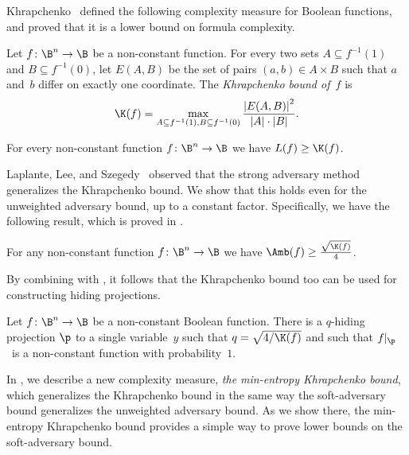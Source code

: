 Khrapchenko~\cite{K72} defined the following complexity measure
for Boolean functions, and proved that it is a lower bound on formula
complexity. 
\begin{definition}
\label{def:khrapchenko}Let $f\colon\B^{n}\to\B$ be a non-constant function.
For every two sets $A\subseteq f^{-1}(1)$ and $B\subseteq f^{-1}(0)$,
let $E(A,B)$ be the set of pairs $(a,b)\in A\times B$ such that
$a$ and~$b$ differ on exactly one coordinate. The \emph{Khrapchenko
bound of~$f$} is 
\[
\K(f)=\max_{A\subseteq f^{-1}(1),B\subseteq f^{-1}(0)}\frac{\left|E(A,B)\right|^{2}}{\left|A\right|\cdot\left|B\right|}.
\]
\end{definition}

\begin{theorem}[\cite{K72}]
\label{thm:khrapchenko-formula-size}For every non-constant function
$f\colon\B^{n}\to\B$ we have $L(f)\ge\K(f)$.
\end{theorem}

Laplante, Lee, and Szegedy~\cite{LLS06} observed that the strong
adversary method generalizes the Khrapchenko bound. We show that this
holds even for the unweighted adversary bound, up to a constant factor.
Specifically, we have the following result, which is proved in .
\begin{proposition}
\label{prop:K-Amb}For any non-constant function $f\colon\B^{n}\to\B$
we have $\Amb(f)\geq\frac{\sqrt{\K(f)}}{4}$.
\end{proposition}

By combining  
with , it follows
that the Khrapchenko bound too can be used for constructing hiding
projections.
\begin{corollary}
\label{cor:khrapchenko-hiding}Let $f\colon\B^{n}\to\B$ be a non-constant
Boolean function. There is a $q$-hiding projection $\p$ to a single
variable~$y$ such that $q=\sqrt{4/\K(f)}$ and such that $f|_{\p}$~is
a non-constant function with probability~$1$.
\end{corollary}

In , we describe a new complexity measure,
\emph{the min-entropy Khrapchenko bound}, which generalizes the Khrapchenko
bound in the same way the soft-adversary bound generalizes the unweighted
adversary bound. As we show there, the min-entropy Khrapchenko bound
provides a simple way to prove lower bounds on the soft-adversary
bound.

